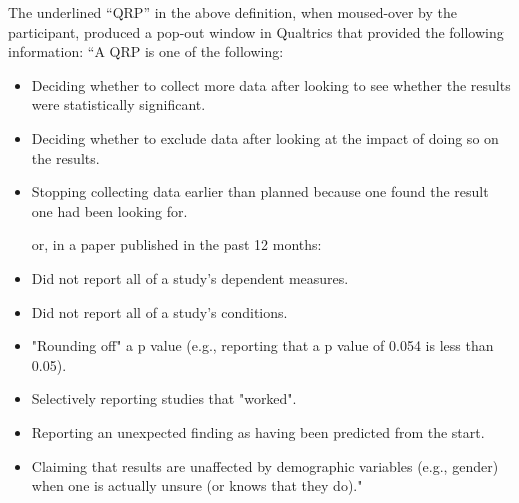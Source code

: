 \documentclass[man]{apa6}
\theoremstyle{definition}
\theoremstyle{definition}
\theoremstyle{definition}
\theoremstyle{remark}
\begin{document}
The underlined \enquote{QRP} in the above definition, when moused-over
by the participant, produced a pop-out window in Qualtrics that provided
the following information: ``A QRP is one of the following:

\begin{itemize}
\item Deciding whether to collect more data after looking to see whether the results were statistically significant.
\item Deciding whether to exclude data after looking at the impact of doing so on the results.
\item Stopping collecting data earlier than planned because one found the result one had been looking for.

or, in a paper published in the past 12 months:
\item Did not report all of a study's dependent measures.
\item Did not report all of a study's conditions.
\item "Rounding off" a p value (e.g., reporting that a p value of 0.054 is less than 0.05).
\item Selectively reporting studies that "worked".
\item Reporting an unexpected finding as having been predicted from the start.
\item Claiming that results are unaffected by demographic variables (e.g., gender) when one is actually unsure (or knows that they do)."
\end{itemize}

\newpage

\begingroup
\setlength{\parindent}{-0.5in} \setlength{\leftskip}{0.5in}

\hypertarget{refs}{}

\endgroup
\end{document}
